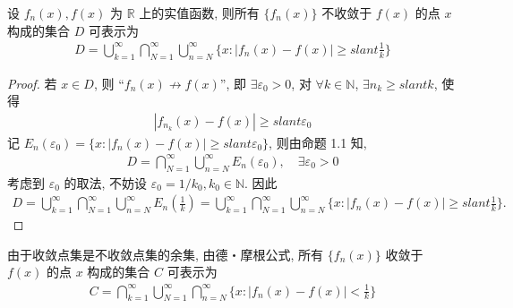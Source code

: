 \documentclass[../../main.tex]{subfiles}
\begin{document}
\begin{example}
设 $f_n(x), f(x)$ 为 $\mathbb{R}$ 上的实值函数, 则所有 $\{f_n(x)\}$ 不收敛于 $f(x)$ 的点 $x$ 构成的集合 $D$ 可表示为
\begin{align*}
D = \bigcup_{k = 1}^{\infty} \bigcap_{N = 1}^{\infty} \bigcup_{n = N}^{\infty} \{x : |f_n(x) - f(x)| \geqslant slant \frac{1}{k}\}
\end{align*}
\end{example}
\begin{proof}
若 $x \in D$, 则 “$f_n(x) \nrightarrow f(x)$”, 即 $\exists \varepsilon_0 > 0$, 对 $\forall k \in \mathbb{N}$, $\exists n_k \geqslant slant k$, 使得
\begin{align*}
|f_{n_k}(x) - f(x)| \geqslant slant \varepsilon_0
\end{align*}
记 $E_n(\varepsilon_0) = \{x : |f_n(x) - f(x)| \geqslant slant \varepsilon_0\}$, 则由命题 1.1 知,
\begin{align*}
D = \bigcap_{N = 1}^{\infty} \bigcup_{n = N}^{\infty} E_n(\varepsilon_0), \quad \exists \varepsilon_0 > 0
\end{align*}
考虑到 $\varepsilon_0$ 的取法, 不妨设 $\varepsilon_0 = 1/k_0, k_0 \in \mathbb{N}$. 因此
\begin{align*}
D = \bigcup_{k = 1}^{\infty} \bigcap_{N = 1}^{\infty} \bigcup_{n = N}^{\infty} E_n\left(\frac{1}{k}\right)
= \bigcup_{k = 1}^{\infty} \bigcap_{N = 1}^{\infty} \bigcup_{n = N}^{\infty} \{x : |f_n(x) - f(x)| \geqslant slant \frac{1}{k}\}.
\end{align*}
\end{proof}
\begin{remark}
由于收敛点集是不收敛点集的余集, 由德・摩根公式, 所有 $\{f_n(x)\}$ 收敛于 $f(x)$ 的点 $x$ 构成的集合 $C$ 可表示为
\begin{align*}
C = \bigcap_{k = 1}^{\infty} \bigcup_{N = 1}^{\infty} \bigcap_{n = N}^{\infty} \{x : |f_n(x) - f(x)| < \frac{1}{k}\}
\end{align*} 
\end{remark}
\end{document}
